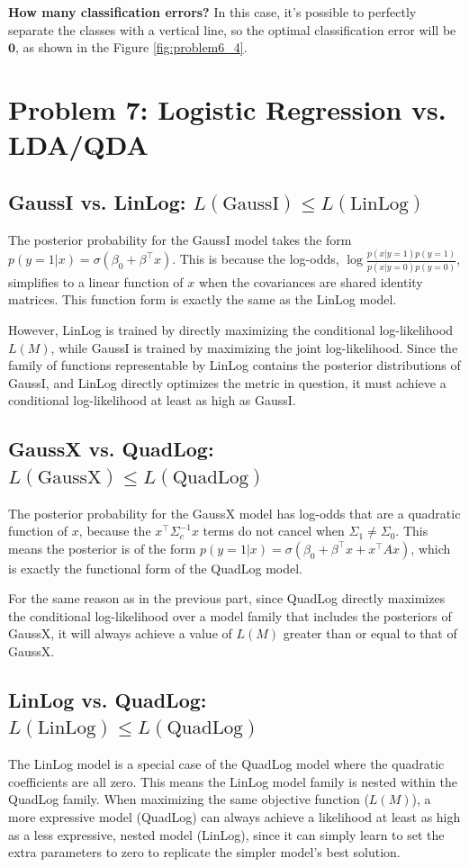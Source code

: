 \documentclass[11pt, a4paper, oneside]{memoir}
\begin{document}
\textbf{How many classification errors?} In this case, it's possible to perfectly separate the classes with a vertical line,
so the optimal classification error will be $\textbf{0}$, as shown in the Figure \ref{fig:problem6_4}.

\chapter{Problem 7: Logistic Regression vs. LDA/QDA}
\section[GaussI vs. LinLog]{GaussI vs. LinLog: $L(\text{GaussI}) \le L(\text{LinLog})$}
The posterior probability for the GaussI model takes the form $p(y=1|x) = \sigma(\beta_0 + \beta^\top x)$.
This is because the log-odds, $\log \frac{p(x|y=1)p(y=1)}{p(x|y=0)p(y=0)}$, simplifies to a linear function of $x$
when the covariances are shared identity matrices. This function form is exactly the same as the LinLog model.

However, LinLog is trained by directly maximizing the conditional log-likelihood $L(M)$, while GaussI is trained by maximizing the joint log-likelihood.
Since the family of functions representable by LinLog contains the posterior distributions of GaussI,
and LinLog directly optimizes the metric in question,
it must achieve a conditional log-likelihood at least as high as GaussI.

\section[GaussX vs. QuadLog]{GaussX vs. QuadLog: $L(\text{GaussX}) \le L(\text{QuadLog})$}
The posterior probability for the GaussX model has log-odds that are a quadratic function of $x$,
because the $x^\top \Sigma_c^{-1} x$ terms do not cancel when $\Sigma_1 \neq \Sigma_0$.
This means the posterior is of the form $p(y=1|x) = \sigma(\beta_0 + \beta^\top x + x^\top A x)$,
which is exactly the functional form of the QuadLog model.

For the same reason as in the previous part,
since QuadLog directly maximizes the conditional log-likelihood over a model family that includes the posteriors of GaussX,
it will always achieve a value of $L(M)$ greater than or equal to that of GaussX.

\section[LinLog vs. QuadLog]{LinLog vs. QuadLog: $L(\text{LinLog}) \le L(\text{QuadLog})$}
The LinLog model is a special case of the QuadLog model where the quadratic coefficients are all zero.
This means the LinLog model family is nested within the QuadLog family.
When maximizing the same objective function ($L(M)$),
a more expressive model (QuadLog) can always achieve a likelihood at least as high as a less expressive, nested model (LinLog),
since it can simply learn to set the extra parameters to zero to replicate the simpler model's best solution.
\end{document}
